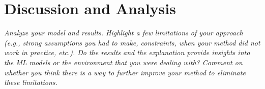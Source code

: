 \documentclass{article}
\begin{document}







\section{Discussion and Analysis}

\textit{Analyze your model and results. Highlight a few limitations of your approach (e.g., strong assumptions you had to make, constraints, when your method did not work in practice, etc.). Do
the results and the explanation provide insights into the ML models or the environment that you were dealing with? Comment on whether you think there is a way to further improve your method to eliminate these limitations.}
\end{document}
